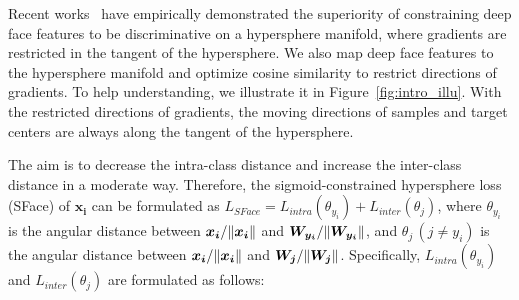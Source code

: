 \documentclass[journal,comsoc]{IEEEtran}
\begin{document}
Recent works~\cite{wang2017normface,Liu2017SphereFace,Wang2018CosFace,deng2019arcface} have empirically demonstrated the superiority of constraining deep face features to be discriminative on a hypersphere manifold, where gradients are restricted in the tangent of the hypersphere. We also map deep face features to the hypersphere manifold and optimize cosine similarity to restrict directions of gradients. To help understanding, we illustrate it in Figure~\ref{fig:intro_illu}. With the restricted directions of gradients, the moving directions of samples and target centers are always along the tangent of the hypersphere. 



The aim is to decrease the intra-class distance and increase the inter-class distance in a moderate way. Therefore, the sigmoid-constrained hypersphere loss (SFace) of $\bm{{x_i}}$ can be formulated as ${L_{SFace}} = {L_{intra}}\left( {{\theta _{{y_i}}}} \right) + {L_{inter}}\left( {{\theta _j}} \right)$, where $\theta _{{y_i}}$ is the angular distance between ${\bm{{{x_i}}} \mathord{\left/
		{\vphantom {{\bm{x_i}} {\left\| {\bm{x_i}} \right\|}}} \right.
		\kern-\nulldelimiterspace} {\left\| {\bm{x_i}} \right\|}}$ and ${{\bm{{W_{{y_i}}}}} \mathord{\left/
		{\vphantom {{\bm{W_{{y_i}}}} {\left\| {\bm{W_{{y_i}}}} \right\|}}} \right.
		\kern-\nulldelimiterspace} {\left\| {\bm{W_{{y_i}}}} \right\|}}$, and $\theta _{{j}}\,(j \ne {y_i})$ is the angular distance  between ${\bm{{{x_i}}} \mathord{\left/
		{\vphantom {{\bm{x_i}} {\left\| {\bm{x_i}} \right\|}}} \right.
		\kern-\nulldelimiterspace} {\left\| {\bm{x_i}} \right\|}}$ and ${\bm{{{W_{{j}}}}} \mathord{\left/
		{\vphantom {{\bm{W_{{j}}}} {\left\| {\bm{W_{{j}}}} \right\|}}} \right.
		\kern-\nulldelimiterspace} {\left\| {\bm{W_{{j}}}} \right\|}}$. Specifically,  ${L_{intra}}\left( {{\theta _{{y_i}}}} \right)$ and ${L_{inter}}\left( {{\theta _j}} \right)$ are formulated as follows:
\end{document}
